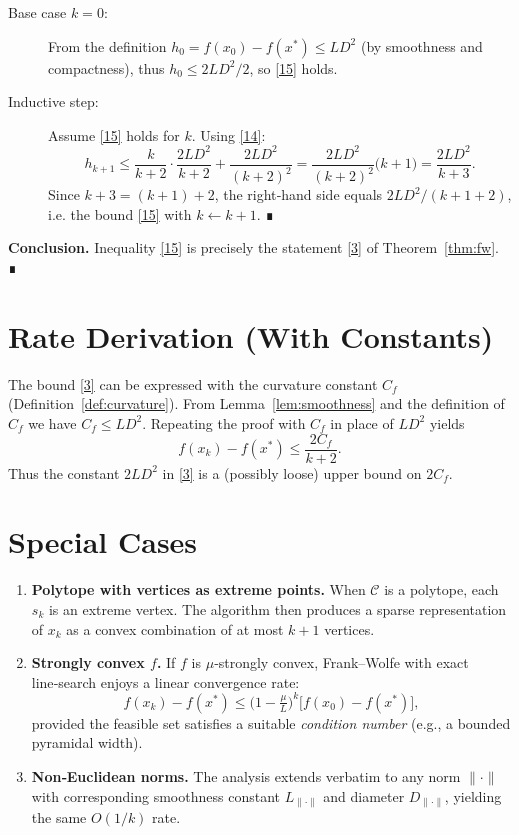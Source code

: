 \documentclass{article}
\begin{document}
\begin{enumerate}[label={\bf [Step \arabic*]}]
\begin{description}
\item[Base case $k=0$:]  
From the definition $h_{0}=f(x_{0})-f(x^{*})\le L D^{2}$ (by smoothness and compactness), thus
$h_{0}\le 2L D^{2}/2$, so \eqref{15} holds.

\item[Inductive step:]  
Assume \eqref{15} holds for $k$. Using \eqref{14}:
\[
h_{k+1}\le \frac{k}{k+2}\cdot\frac{2L D^{2}}{k+2}
+\frac{2L D^{2}}{(k+2)^{2}}
= \frac{2L D^{2}}{(k+2)^{2}}\bigl(k+1\bigr)
= \frac{2L D^{2}}{k+3}.
\]
Since $k+3=(k+1)+2$, the right‑hand side equals $2L D^{2}/(k+1+2)$, i.e. the bound \eqref{15} with $k\leftarrow k+1$. ∎
\end{description}

\item \textbf{Conclusion.}  
Inequality \eqref{15} is precisely the statement \eqref{3} of Theorem~\ref{thm:fw}. ∎
\end{enumerate}

\section*{Rate Derivation (With Constants)}
The bound \eqref{3} can be expressed with the curvature constant $C_{f}$ (Definition~\ref{def:curvature}).  
From Lemma~\ref{lem:smoothness} and the definition of $C_{f}$ we have $C_{f}\le L D^{2}$.  
Repeating the proof with $C_{f}$ in place of $L D^{2}$ yields
\[
f(x_{k})-f(x^{*})\le \frac{2 C_{f}}{k+2}.
\tag{16}
\]
Thus the constant $2L D^{2}$ in \eqref{3} is a (possibly loose) upper bound on $2C_{f}$.

\section*{Special Cases}
\begin{enumerate}[label=\textbf{S\arabic*.}]
\item \textbf{Polytope with vertices as extreme points.}  
When $\mathcal C$ is a polytope, each $s_{k}$ is an extreme vertex. The algorithm then produces a sparse representation of $x_{k}$ as a convex combination of at most $k+1$ vertices.

\item \textbf{Strongly convex $f$.}  
If $f$ is $\mu$‑strongly convex, Frank–Wolfe with exact line‑search enjoys a linear convergence rate:
\[
f(x_{k})-f(x^{*})\le \bigl(1-\tfrac{\mu}{L}\bigr)^{k}\bigl[f(x_{0})-f(x^{*})\bigr],
\]
provided the feasible set satisfies a suitable \emph{condition number} (e.g., a bounded pyramidal width).

\item \textbf{Non‑Euclidean norms.}  
The analysis extends verbatim to any norm $\|\cdot\|$ with corresponding smoothness constant $L_{\|\cdot\|}$ and diameter $D_{\|\cdot\|}$, yielding the same $O(1/k)$ rate.
\end{enumerate}
\end{document}
